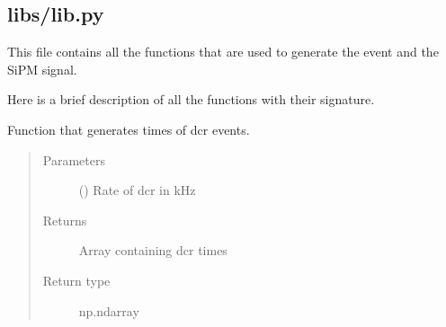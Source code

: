 \documentclass[letterpaper,10pt,english]{sphinxmanual}
\begin{document}
\subsection{libs/lib.py}
\label{\detokenize{structure:libs-lib-py}}
\begin{DUlineblock}{0em}
\item[] This file contains all the functions that are used to generate the event and the SiPM signal.
\item[] Here is a brief description of all the functions with their signature.
\end{DUlineblock}

\begin{fulllineitems}
\label{\detokenize{structure:libs.lib.addDCR}}
Function that generates times of dcr events.
\begin{quote}\begin{description}
\item[{Parameters}] \leavevmode
{} () \textendash{} Rate of dcr in kHz

\item[{Returns}] \leavevmode
{} \textendash{} Array containing dcr times

\item[{Return type}] \leavevmode
np.ndarray

\end{description}\end{quote}

\end{fulllineitems}

\end{document}
